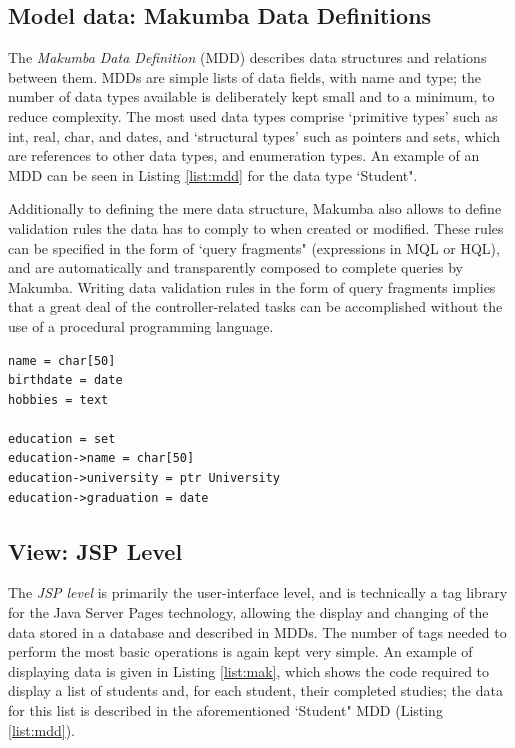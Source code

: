 \documentclass{chi2009}
\begin{document}
\subsection{Model data: Makumba Data Definitions}
The \textit{Makumba Data Definition} (MDD) describes data structures and relations between them. MDDs are simple lists of data fields, with name and type; the number of data types available is deliberately kept small and to a minimum, to reduce complexity. The most used data types comprise `primitive types' such as int, real, char, and dates, and `structural types' such as pointers and sets, which are references to other data types, and enumeration types. An example of an MDD can be seen in Listing \ref{list:mdd} for the data type `Student".

Additionally to defining the mere data structure, Makumba also allows to define validation rules the data has to comply to when created or modified. These rules can be specified in the form of `query fragments" (expressions in MQL or HQL), and are automatically and transparently composed to complete queries by Makumba. Writing data validation rules in the form of query fragments implies that a great deal of the controller-related tasks can be accomplished without the use of a procedural programming language.

\lstset{basicstyle=\small, captionpos=b, caption=Makumba Data Definition "Student", label=list:mdd, frame=shadowbox}
\begin{lstlisting}
name = char[50]
birthdate = date
hobbies = text

education = set
education->name = char[50]
education->university = ptr University
education->graduation = date
\end{lstlisting}

\subsection{View: JSP Level}
The \textit{JSP level} is primarily the user-interface level, and is technically a tag library for the Java Server Pages technology, allowing the display and changing of the data stored in a database and described in MDDs. The number of tags needed to perform the most basic operations is again kept very simple. An example of displaying data is given in Listing \ref{list:mak}, which shows the code required to display a list of students and, for each student, their completed studies; the data for this list is described in the aforementioned `Student" MDD (Listing \ref{list:mdd}).
\end{document}
